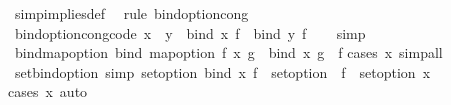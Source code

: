 \begin{isabellebody}
\ simp{\isacharunderscore}{\kern0pt}implies{\isacharunderscore}{\kern0pt}def\ \isamarkupfalse%
\ {\isacharparenleft}{\kern0pt}rule\ bind{\isacharunderscore}{\kern0pt}option{\isacharunderscore}{\kern0pt}cong{\isacharparenright}{\kern0pt}%
\endisatagproof
{\isafoldproof}%
%
\isadelimproof
\isanewline
%
\endisadelimproof
\isanewline
{}\isamarkupfalse%
\ bind{\isacharunderscore}{\kern0pt}option{\isacharunderscore}{\kern0pt}cong{\isacharunderscore}{\kern0pt}code{\isacharcolon}{\kern0pt}\ {\isachardoublequoteopen}x\ {\isacharequal}{\kern0pt}\ y\ {\isasymLongrightarrow}\ bind\ x\ f\ {\isacharequal}{\kern0pt}\ bind\ y\ f{\isachardoublequoteclose}\isanewline
%
\isadelimproof
\ \ %
\endisadelimproof
%
\isatagproof
{}\isamarkupfalse%
\ simp%
\endisatagproof
{\isafoldproof}%
%
\isadelimproof
\isanewline
%
\endisadelimproof
\isanewline
{}\isamarkupfalse%
\ bind{\isacharunderscore}{\kern0pt}map{\isacharunderscore}{\kern0pt}option{\isacharcolon}{\kern0pt}\ {\isachardoublequoteopen}bind\ {\isacharparenleft}{\kern0pt}map{\isacharunderscore}{\kern0pt}option\ f\ x{\isacharparenright}{\kern0pt}\ g\ {\isacharequal}{\kern0pt}\ bind\ x\ {\isacharparenleft}{\kern0pt}g\ {\isasymcirc}\ f{\isacharparenright}{\kern0pt}{\isachardoublequoteclose}\isanewline
%
\isadelimproof
%
\endisadelimproof
%
\isatagproof
{}\isamarkupfalse%
{\isacharparenleft}{\kern0pt}cases\ x{\isacharparenright}{\kern0pt}\ simp{\isacharunderscore}{\kern0pt}all%
\endisatagproof
{\isafoldproof}%
%
\isadelimproof
\isanewline
%
\endisadelimproof
\isanewline
{}\isamarkupfalse%
\ set{\isacharunderscore}{\kern0pt}bind{\isacharunderscore}{\kern0pt}option\ {\isacharbrackleft}{\kern0pt}simp{\isacharbrackright}{\kern0pt}{\isacharcolon}{\kern0pt}\ {\isachardoublequoteopen}set{\isacharunderscore}{\kern0pt}option\ {\isacharparenleft}{\kern0pt}bind\ x\ f{\isacharparenright}{\kern0pt}\ {\isacharequal}{\kern0pt}\ {\isacharparenleft}{\kern0pt}{\isasymUnion}{\isacharparenleft}{\kern0pt}{\isacharparenleft}{\kern0pt}set{\isacharunderscore}{\kern0pt}option\ {\isasymcirc}\ f{\isacharparenright}{\kern0pt}\ {\isacharbackquote}{\kern0pt}\ set{\isacharunderscore}{\kern0pt}option\ x{\isacharparenright}{\kern0pt}{\isacharparenright}{\kern0pt}{\isachardoublequoteclose}\isanewline
%
\isadelimproof
%
\endisadelimproof
%
\isatagproof
{}\isamarkupfalse%
{\isacharparenleft}{\kern0pt}cases\ x{\isacharparenright}{\kern0pt}\ auto%
\endisatagproof
{\isafoldproof}%
%
\isadelimproof
\isanewline
%
\endisadelimproof
\isanewline
{}\isamarkupfalse%

\end{isabellebody}
